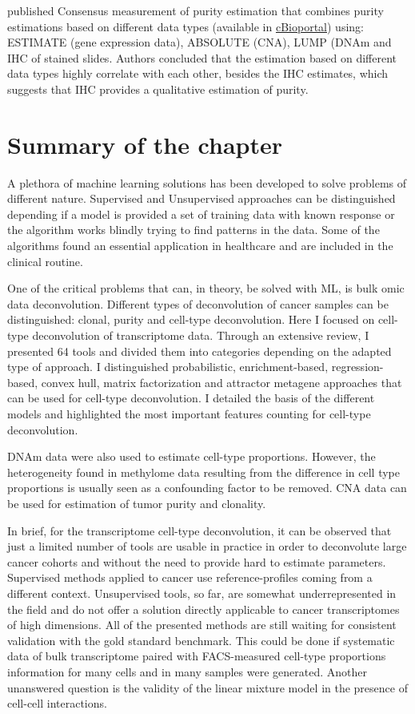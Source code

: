 \documentclass[12pt,]{book}
\theoremstyle{definition}
\theoremstyle{definition}
\theoremstyle{definition}
\theoremstyle{remark}
\begin{document}
\citet{Aran2015} published Consensus measurement of purity estimation
that combines purity estimations based on different data types
(available in \href{http://www.cbioportal.org/}{cBioportal}) using:
ESTIMATE \citep{Yoshihara2013} (gene expression data), ABSOLUTE
\citep{Carter2012} (CNA), LUMP \citep{Aran2015} (DNAm and IHC of stained
slides. Authors concluded that the estimation based on different data
types highly correlate with each other, besides the IHC estimates, which
suggests that IHC provides a qualitative estimation of purity.

\hypertarget{summary-of-the-chapter-1}{%
\section{Summary of the chapter}\label{summary-of-the-chapter-1}}

A plethora of machine learning solutions has been developed to solve
problems of different nature. Supervised and Unsupervised approaches can
be distinguished depending if a model is provided a set of training data
with known response or the algorithm works blindly trying to find
patterns in the data. Some of the algorithms found an essential
application in healthcare and are included in the clinical routine.

One of the critical problems that can, in theory, be solved with ML, is
bulk omic data deconvolution. Different types of deconvolution of cancer
samples can be distinguished: clonal, purity and cell-type
deconvolution. Here I focused on cell-type deconvolution of
transcriptome data. Through an extensive review, I presented 64 tools
and divided them into categories depending on the adapted type of
approach. I distinguished probabilistic, enrichment-based,
regression-based, convex hull, matrix factorization and attractor
metagene approaches that can be used for cell-type deconvolution. I
detailed the basis of the different models and highlighted the most
important features counting for cell-type deconvolution.

DNAm data were also used to estimate cell-type proportions. However, the
heterogeneity found in methylome data resulting from the difference in
cell type proportions is usually seen as a confounding factor to be
removed. CNA data can be used for estimation of tumor purity and
clonality.

In brief, for the transcriptome cell-type deconvolution, it can be
observed that just a limited number of tools are usable in practice in
order to deconvolute large cancer cohorts and without the need to
provide hard to estimate parameters. Supervised methods applied to
cancer use reference-profiles coming from a different context.
Unsupervised tools, so far, are somewhat underrepresented in the field
and do not offer a solution directly applicable to cancer transcriptomes
of high dimensions. All of the presented methods are still waiting for
consistent validation with the gold standard benchmark. This could be
done if systematic data of bulk transcriptome paired with FACS-measured
cell-type proportions information for many cells and in many samples
were generated. Another unanswered question is the validity of the
linear mixture model in the presence of cell-cell interactions.
\end{document}
